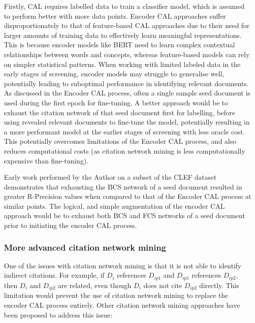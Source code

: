 \documentclass[../main.tex]{subfiles}
\begin{document}
Firstly, CAL requires labelled data to train a classifier model, which is assumed to perform better with more data points. Encoder CAL approaches suffer disproportionately to that of feature-based CAL approaches due to their need for larger amounts of training data to effectively learn meaningful representations. This is because encoder models like BERT need to learn complex contextual relationships between words and concepts, whereas feature-based models can rely on simpler statistical patterns. When working with limited labeled data in the early stages of screening, encoder models may struggle to generalise well, potentially leading to suboptimal performance in identifying relevant documents. As discussed in the Encoder CAL process, often a single sample seed document is used during the first epoch for fine-tuning. A better approach would be to exhaust the citation network of that seed document first for labelling, before using revealed relevant documents to fine-tune the model, potentially resulting in a more performant model at the earlier stages of screening with less oracle cost. This potentially overcomes limitations of the Encoder CAL process, and also reduces computational costs (as citation network mining is less computationally expensive than fine-tuning). 

Early work performed by the Author on a subset of the CLEF dataset demonstrates that exhausting the BCS network of a seed document resulted in greater R-Precision values when compared to that of the Encoder CAL process at similar points. The logical, and simple augmentation of the encoder CAL approach would be to exhaust both BCS and FCS networks of a seed document prior to initiating the encoder CAL process. 
\subsubsection{More advanced citation network mining}

One of the issues with citation network mining is that it is not able to identify indirect citations. For example, if $D_i$ references $D_{ip1}$ and $D_{ip1}$ references $D_{ip2}$, then $D_i$ and $D_{ip2}$ are related, even though $D_i$ does not cite $D_{ip2}$ directly. This limitation would prevent the use of citation network mining to replace the encoder CAL process entirely. Other citation network mining approaches have been proposed to address this issue:
\end{document}
